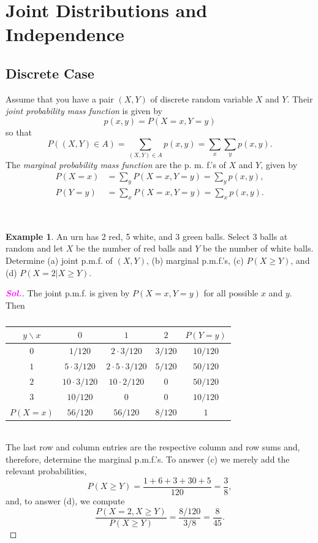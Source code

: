\documentclass[12pt,a4paper]{article}
\theoremstyle{definition}
\newtheorem{example}{Example}[section]
\theoremstyle{definition}
\theoremstyle{definition}
\theoremstyle{definition}
\theoremstyle{remark}
\theoremstyle{definition}
\newcommand{\sol}{\textcolor{magenta}{\bf \textit{Sol.}}\quad}
\begin{document}
\newpage
\section{Joint Distributions and Independence}
\subsection{Discrete Case}
\begin{tcolorbox}[colback=white]
	Assume that you have a pair $(X,Y)$ of discrete random variable $X$ and $Y$. Their \textit{joint probability mass function} is given by \[
	p(x,y)=P(X=x,Y=y)
	\] so that \[
	P\left((X,Y)\in A\right)=\sum_{(X,Y)\in A}p(x,y)=\sum_{x}\sum_{y}p(x,y).
	\] The \textit{marginal probability mass function} are the p. m. f.'s of $X$ and $Y$, given by \begin{align*}
	P(X=x)&=\sum_{y}P(X=x, Y=y)=\sum_{y}p(x,y),\\
	P(Y=y)&=\sum_{x}P(X=x, Y=y)=\sum_{x}p(x,y).
	\end{align*}
\end{tcolorbox}
\
\begin{example}
	An urn has 2 red, 5 white, and 3 green balls. Select 3 balls at random and let $X$ be the number of red balls and $Y$ be the number of white balls. Determine (a) joint p.m.f. of $(X,Y)$, (b) marginal p.m.f.'s, (c) $P(X\geq Y)$, and (d) $P(X=2|X\geq Y)$.\begin{proof}[\sol]
		The joint p.m.f. is given by $P(X=x,Y=y)$ for all possible $x$ and $y$. Then \begin{table}[h!]
			\centering
			\begin{tabular}{c||c|c|c|c}
				\toprule[1.5pt]
				$y\backslash x$ & $0$ & $1$ & $2$ & $P(Y=y)$\\
				\hline\hline
				$0$&$1/{120}$& ${2\cdot3}/{120}$& $3/120$& $10/120$\\
				\hline
				$1$&$5\cdot3/120$&$2\cdot5\cdot3/120$&$5/120$& $50/120$\\
				\hline
				$2$&$10\cdot3/120$&$10\cdot2/120$&$0$& $50/120$\\
				\hline
				$3$&$10/120$&$0$&$0$&$10/120$ \\
				\hline
				$P(X=x)$&$56/120$&$56/120$&$8/120$&$1$ \\
				\bottomrule[1.5pt]
			\end{tabular}
			\caption{}
		\end{table}\ \\ The last row and column entries are the respective column and row sums and, therefore, determine the marginal p.m.f.'s. To answer (c) we merely add the relevant probabilities, \[
	P(X\geq Y)=\frac{1+6+3+30+5}{120}=\frac{3}{8},
	\] and, to answer (d), we compute \[
	\frac{P(X=2, X\geq Y)}{P(X\geq Y)}=\frac{8/120}{3/8}=\frac{8}{45}.
	\]
	\end{proof}
\end{example}
\end{document}
